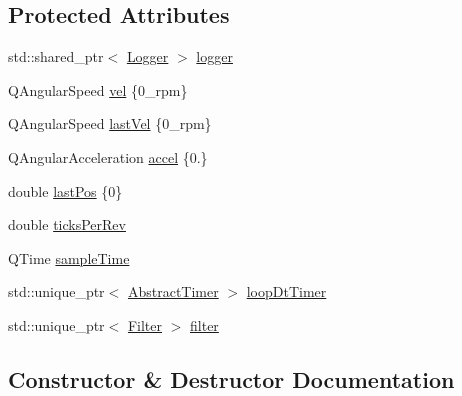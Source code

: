 \subsection*{Protected Attributes}
\begin{DoxyCompactItemize}
\item 
std\+::shared\+\_\+ptr$<$ \mbox{\hyperlink{classokapi_1_1Logger}{Logger}} $>$ \mbox{\hyperlink{classokapi_1_1VelMath_aab9b5774fde584b40fb113808d59eb8b}{logger}}
\item 
Q\+Angular\+Speed \mbox{\hyperlink{classokapi_1_1VelMath_af8386892892d453a118581e46839a0c3}{vel}} \{0\+\_\+rpm\}
\item 
Q\+Angular\+Speed \mbox{\hyperlink{classokapi_1_1VelMath_a237571e8eece5874fdc599e5c49c2258}{last\+Vel}} \{0\+\_\+rpm\}
\item 
Q\+Angular\+Acceleration \mbox{\hyperlink{classokapi_1_1VelMath_abe73288852f21916155e04266faea8b7}{accel}} \{0.\}
\item 
double \mbox{\hyperlink{classokapi_1_1VelMath_a9f669c3d70753ef68971dae4b6f45c27}{last\+Pos}} \{0\}
\item 
double \mbox{\hyperlink{classokapi_1_1VelMath_ad889516cc153d23febbbfd4c9c45e5ec}{ticks\+Per\+Rev}}
\item 
Q\+Time \mbox{\hyperlink{classokapi_1_1VelMath_a015a781b3f7f454f24b1a86a43a9a76d}{sample\+Time}}
\item 
std\+::unique\+\_\+ptr$<$ \mbox{\hyperlink{classokapi_1_1AbstractTimer}{Abstract\+Timer}} $>$ \mbox{\hyperlink{classokapi_1_1VelMath_a36a8a63ac4b47806259e080cfbd0d462}{loop\+Dt\+Timer}}
\item 
std\+::unique\+\_\+ptr$<$ \mbox{\hyperlink{classokapi_1_1Filter}{Filter}} $>$ \mbox{\hyperlink{classokapi_1_1VelMath_ab100cf49e925d37139d5bf4c4aca87d0}{filter}}
\end{DoxyCompactItemize}


\subsection{Constructor \& Destructor Documentation}
\mbox{\label{classokapi_1_1VelMath_af70c4c5ae0a71719e833ba375f76b5d1}} 
